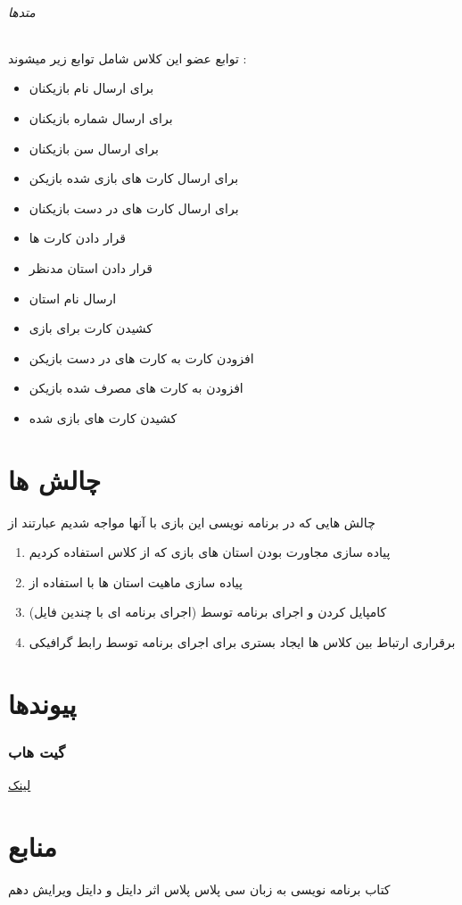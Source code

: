 \documentclass[pdf,titlepage,a4paper]{report}
\begin{document}
	\paragraph{متدها}
	توابع عضو این کلاس شامل توابع زیر میشوند :
	
	\begin{itemize}
		\item {} برای ارسال نام بازیکنان
		\item {} برای ارسال شماره بازیکنان
		\item {}  برای ارسال سن بازیکنان
		\item {} برای ارسال کارت های بازی شده بازیکن
		\item {} برای ارسال کارت های در دست بازیکنان
		\item {} قرار دادن کارت ها
		\item {} قرار دادن استان مدنظر
		\item {} ارسال نام استان
		\item {} کشیدن کارت برای بازی 
		\item {} افزودن کارت به کارت های در دست بازیکن
		\item {} افزودن به کارت های مصرف شده بازیکن
		\item {} کشیدن کارت های بازی شده
	\end{itemize}
	
	\newpage
	
	
	
	\part{چالش ها}
	
	چالش هایی که در برنامه نویسی این بازی با آنها مواجه شدیم عبارتند از 
	\begin{enumerate}
		\item	پیاده سازی مجاورت بودن استان های بازی که از کلاس   استفاده کردیم 
		\item پیاده سازی ماهیت استان ها با استفاده از  
		\item کامپایل کردن و اجرای برنامه توسط  (اجرای برنامه ای با چندین فایل)
    	\item برقراری ارتباط بین کلاس ها  ایجاد بستری برای اجرای برنامه توسط رابط گرافیکی 
	\end{enumerate}

	\newpage
		
	\part{پیوندها}
	\section{گیت هاب}
	\href{https://github.com/Matin0789/Condottiere-.git}{لینک}

	\newpage
	
	
	
	\part{منابع}
	کتاب برنامه نویسی به زبان سی پلاس پلاس اثر دایتل و دایتل ویرایش دهم\\
	\href{https://www.geeksforgeeks.org/c-plus-plus/}{}
	
	
\end{document}
